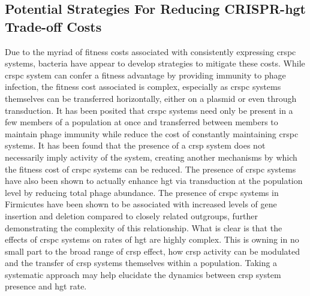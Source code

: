 \subsection{Potential Strategies For Reducing CRISPR-\ac{hgt} Trade-off Costs}
Due to the  myriad of fitness costs associated with consistently expressing \ac{crspc} systems, bacteria have appear to develop strategies to mitigate these costs.
While \ac{crspc} system can confer a fitness advantage by providing immunity to phage infection, the fitness cost associated is complex, especially as \ac{crspc} systems  themselves can be transferred  horizontally, either on a plasmid or even through transduction\citep{crisprlgt}.
It has been posited that \ac{crspc} systems need only be present in a few members of a population at once and transferred between members to maintain phage immunity while reduce the cost of constantly maintaining \ac{crspc} systems\citep{acqorres}.
It has been found that the presence of a \ac{crsp} system does not necessarily imply activity of the system, creating another mechanisms by which the fitness cost of \ac{crspc} systems can be reduced\citep{acqorres}.
The presence of \ac{crspc} systems have also been shown to actually enhance \ac{hgt} via transduction at the population level by reducing total phage abundance\citep{transhgt}.
The presence of \ac{crspc} systems in Firmicutes have been shown to be associated with increased levels of gene insertion and deletion compared to closely related outgroups, further demonstrating the complexity of this relationship\citep{athena}.
What is clear is that the effects of \ac{crspc} systems on rates of \ac{hgt} are highly complex.
This is owning in no small part to the broad range of \ac{crsp} effect, how \ac{crsp} activity can be modulated and the transfer of \ac{crsp} systems themselves within a population\citep{acqorres}.
Taking a systematic approach may help elucidate the dynamics between \ac{crsp} system presence and \ac{hgt} rate.

